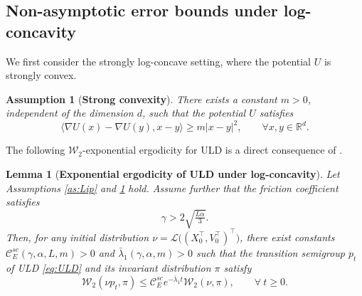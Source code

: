 \documentclass[12pt]{article}
\numberwithin{equation}{section}
\newtheorem{lem}{Lemma}[section]
\newtheorem{assumption}{Assumption}[section]
\begin{document}
\subsection{Non-asymptotic error bounds under log-concavity}

We first consider the strongly log-concave setting, where the potential \(U\) is strongly convex. 
%





\begin{assumption}[\textbf{Strong convexity}]
\label{as:strongly-convex}
There exists a constant \(m>0\), independent of the dimension $d$, such that the potential \(U\) satisfies
\begin{equation}
\label{eq:m-convex}
\big\langle
\nabla U(x)-\nabla U(y),
x-y
\big\rangle
\geq
m|x-y|^2,
\qquad
\forall x,y\in\mathbb R^d .
\end{equation}
\end{assumption}

%
The following \(\mathcal W_2\)-exponential ergodicity for ULD is a direct consequence of \cite[Theorem 1]{schuh2024global}.

\begin{lem}[\textbf{Exponential ergodicity of ULD under log-concavity}]
\label{lem:erg-convex}
Let Assumptions \ref{as:Lip} and  \ref{as:strongly-convex}  hold. 
Assume further that the friction coefficient satisfies
\begin{equation}
\label{eq:condition-of-friction-coefficient}
\gamma>2\sqrt{\tfrac{L\alpha}{3}}.
\end{equation}
Then, for any initial distribution \(\nu=\mathcal{L} \big((X_0^\top,V_0^\top)^\top
\big)
\), there exist constants
\(
\mathcal 
C_E^{sc}
(\gamma,\alpha,L,m)>0\) and 
\(
\bar{\lambda}_1(\gamma,\alpha,m)>0
\)
such that the transition semigroup \(p_t\) of ULD \eqref{eq:ULD} and its invariant distribution \(\pi\) satisfy
\begin{equation}
\label{eq:ULD-exp-erg-convex}
\mathcal W_{2}
(
\nu p_t,
\pi
)
\leq
\mathcal  C_E^{sc}
e^{- \bar{\lambda}_1 t}
\mathcal W_{2}
(
\nu,
\pi
),
\qquad
\forall  
\ t\geq0 .
\end{equation}
\end{lem}
\end{document}
